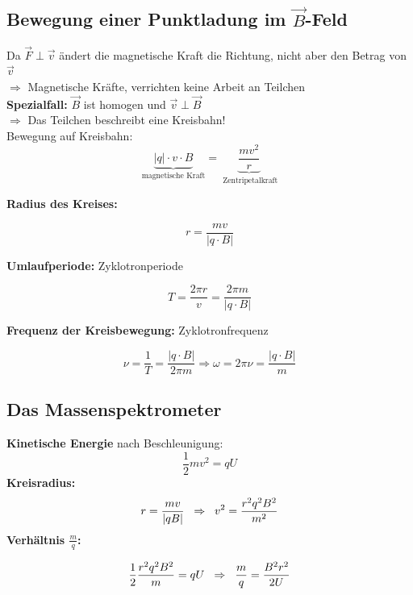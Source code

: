\subsection{Bewegung einer Punktladung im \texorpdfstring{$\Vec{B}$}{B}-Feld}
Da $\Vec{F} \perp \Vec{v}$ ändert die magnetische Kraft die Richtung, nicht aber den Betrag von $\Vec{v}$ \\
\hspace{3mm} $\Rightarrow$ Magnetische Kräfte, verrichten keine Arbeit an Teilchen \\[2ex]

\textbf{Spezialfall:} $\Vec{B}$ ist homogen und $\Vec{v} \perp \Vec{B}$ \\
$\Rightarrow$ Das Teilchen beschreibt eine Kreisbahn! \\[1ex]
Bewegung auf Kreisbahn:
\[
    \underbrace{|q| \cdot v \cdot B}_{\text{magnetische Kraft}} = \underbrace{\frac{mv^2}{r}}_{\text{ Zentripetalkraft}}
\]

\textbf{Radius des Kreises:}
\begin{formulabox}
    \[
        r = \frac{mv}{|q \cdot B|}
    \]
\end{formulabox}

\textbf{Umlaufperiode:} Zyklotronperiode
\begin{formulabox}
    \[
        T = \frac{2 \pi r}{v} = \frac{2 \pi m}{|q \cdot B|}
    \]
\end{formulabox}

\textbf{Frequenz der Kreisbewegung:} Zyklotronfrequenz
\begin{formulabox}
    \[
        \nu = \frac{1}{T} = \frac{|q \cdot B|}{2 \pi m} \Rightarrow \omega = 2\pi\nu = \frac{|q \cdot B|}{m}
    \]
\end{formulabox}

\subsection{Das Massenspektrometer}
\textbf{Kinetische Energie} nach Beschleunigung:
\[
    \frac{1}{2} m v^2 = q U
\]
\textbf{Kreisradius:}
\[
    r = \frac{m v}{|q B|} \hspace{2mm} \Rightarrow \hspace{2mm} v^2 = \frac{r^2 q^2 B^2}{m^2}
\]
\textbf{Verhältnis $\frac{m}{q}$:}
\begin{formulabox}
    \[
        \frac{1}{2}\frac{r^2 q^2 B^2}{m} = q U \hspace{2mm} \Rightarrow \hspace{2mm} \frac{m}{q} = \frac{B^2 r^2}{2 U}
    \]
\end{formulabox}

